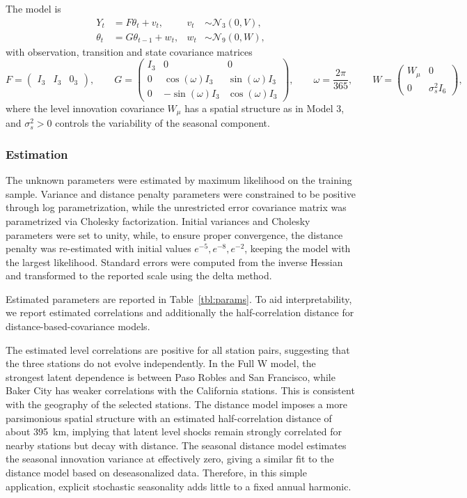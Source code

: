 \documentclass[10pt]{article}
\begin{document}
The model is
\[
\begin{aligned}
Y_t &= F\theta_t + v_t,
& v_t &\sim \mathcal{N}_3(0,V), \\
\theta_t &= G\theta_{t-1} + w_t,
& w_t &\sim \mathcal{N}_{9}(0,W),
\end{aligned}
\]
with observation, transition and state covariance matrices
\[
F =
\begin{pmatrix}
I_3 & I_3 & 0_3
\end{pmatrix},
\qquad
G =
\begin{pmatrix}
I_3 & 0 & 0 \\
0 & \cos(\omega) I_3 & \sin(\omega) I_3 \\
0 & -\sin(\omega) I_3 & \cos(\omega) I_3
\end{pmatrix},
\qquad
\omega = \frac{2\pi}{365},
\qquad
W =
\begin{pmatrix}
W_\mu & 0 \\
0 & \sigma_s^2 I_{6}
\end{pmatrix},
\]
where the level innovation covariance \(W_\mu\) has a spatial structure as in Model 3, and \(\sigma_s^2>0\) controls the variability of the seasonal component.

\subsubsection*{Estimation}

The unknown parameters were estimated by maximum likelihood on the training sample.
Variance and distance penalty parameters were constrained to be positive through log parametrization, while the unrestricted error covariance matrix was parametrized via Cholesky factorization.
Initial variances and Cholesky parameters were set to unity, while, to ensure proper convergence, the distance penalty was re-estimated with initial values \(e^{-5}, e^{-8}, e^{-2}\), keeping the model with the largest likelihood.
Standard errors were computed from the inverse Hessian and transformed to the reported scale using the delta method.

Estimated parameters are reported in Table~\ref{tbl:params}.
To aid interpretability, we report estimated correlations and additionally the half-correlation distance for distance-based-covariance models.

The estimated level correlations are positive for all station pairs, suggesting that the three stations do not evolve independently.
In the Full W model, the strongest latent dependence is between Paso Robles and San Francisco, while Baker City has weaker correlations with the California stations.
This is consistent with the geography of the selected stations.
The distance model imposes a more parsimonious spatial structure with an estimated half-correlation distance of about \SI{395}{km}, implying that latent level shocks remain strongly correlated for nearby stations but decay with distance.
The seasonal distance model estimates the seasonal innovation variance at effectively zero, giving a similar fit to the distance model based on deseasonalized data.
Therefore, in this simple application, explicit stochastic seasonality adds little to a fixed annual harmonic.
\end{document}
